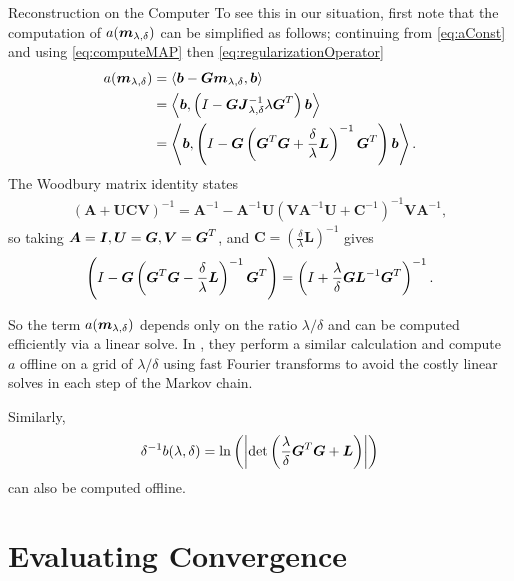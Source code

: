 \begin{chapter}{Reconstruction on the Computer}
To see this in our situation, first note that the computation of $a(\mbox{\boldmath$m$}_{\lambda,\delta})$ can be simplified as follows; continuing from \eqref{eq:aConst} and using \eqref{eq:computeMAP} then \eqref{eq:regularizationOperator}
\begin{align}
  a(\mbox{\boldmath$m$}_{\lambda,\delta}) 
    &= \left\langle\mbox{\boldmath$b$} - \mbox{\boldmath$G$}\mbox{\boldmath$m$}_{\lambda,\delta},\mbox{\boldmath$b$}\right\rangle\nonumber\\
    &=  \left\langle\mbox{\boldmath$b$},\left(I - \mbox{\boldmath$G$}  \mbox{\boldmath$J$}_{\lambda,\delta}^{-1}\lambda\mbox{\boldmath$G$}^T\right) \mbox{\boldmath$b$}\right\rangle\nonumber\\
    &= \left\langle \mbox{\boldmath$b$},\left( I - \mbox{\boldmath$G$}  \left( \mbox{\boldmath$G$}^T\mbox{\boldmath$G$} + \frac{\delta}{\lambda}\mbox{\boldmath$L$} \right)^{-1}\mbox{\boldmath$G$}^T \right)\mbox{\boldmath$b$} \right\rangle. 
\end{align}
The Woodbury matrix identity \citep{woodbury1950inverting} states
\begin{align}
  (\bm A + \bm U\bm C\bm V)^{-1} = \bm A^{-1} - \bm A^{-1}\bm U\left(\bm V\bm A^{-1}\bm U + \bm C^{-1}\right)^{-1}\bm V\bm A^{-1},
\end{align}
so taking $\mbox{\boldmath$A$} = \mbox{\boldmath$I$},\mbox{\boldmath$U$}=\mbox{\boldmath$G$}, \mbox{\boldmath$V$}=\mbox{\boldmath$G$}^T$, and $\bm C= \left(\frac\delta \lambda\bm L\right)^{-1}$ gives
\begin{equation}
  \left(I - \mbox{\boldmath$G$}  \left(\mbox{\boldmath$G$}^T\mbox{\boldmath$G$} - \frac{\delta}{\lambda}\mbox{\boldmath$L$}\right)^{-1}\mbox{\boldmath$G$}^T\right)
  = \left(I + \frac \lambda\delta \mbox{\boldmath$G$}\mbox{\boldmath$L$}^{-1}\mbox{\boldmath$G$}^T\right)^{-1}.
\end{equation}

So the term $a(\mbox{\boldmath$m$}_{\lambda,\delta})$ depends only on the ratio $\lambda/\delta$ and can be computed efficiently via a linear solve.
In \citep{fox2015fast}, they perform a similar calculation and compute $a$ offline on a grid of $\lambda/\delta$ using fast Fourier transforms to avoid the costly linear solves in each step of the Markov chain.

Similarly, 
\begin{equation}
  \delta^{-1}b(\lambda,\delta) = \ln\left(\left|\det\left(\frac \lambda\delta \mbox{\boldmath$G$}^T\mbox{\boldmath$G$} + \mbox{\boldmath$L$}\right)\right|\right)
\end{equation}
can also be computed offline.  

\section{Evaluating Convergence} \label{sec:evaluatingConvergence}


\end{chapter}
